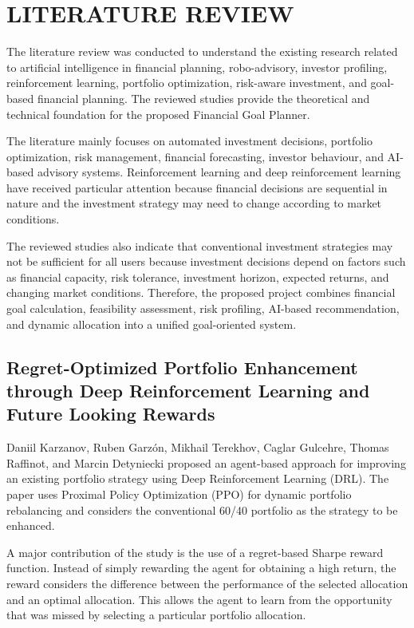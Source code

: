\chapter{\uppercase{Literature Review}}
The literature review was conducted to understand the existing research related to artificial intelligence in financial planning, robo-advisory, investor profiling, reinforcement learning, portfolio optimization, risk-aware investment, and goal-based financial planning. The reviewed studies provide the theoretical and technical foundation for the proposed Financial Goal Planner.

The literature mainly focuses on automated investment decisions, portfolio optimization, risk management, financial forecasting, investor behaviour, and AI-based advisory systems. Reinforcement learning and deep reinforcement learning have received particular attention because financial decisions are sequential in nature and the investment strategy may need to change according to market conditions.

The reviewed studies also indicate that conventional investment strategies may not be sufficient for all users because investment decisions depend on factors such as financial capacity, risk tolerance, investment horizon, expected returns, and changing market conditions. Therefore, the proposed project combines financial goal calculation, feasibility assessment, risk profiling, AI-based recommendation, and dynamic allocation into a unified goal-oriented system.

\section{Regret-Optimized Portfolio Enhancement through Deep Reinforcement Learning and Future Looking Rewards}
Daniil Karzanov, Ruben Garz\'on, Mikhail Terekhov, Caglar Gulcehre, Thomas Raffinot, and Marcin Detyniecki proposed an agent-based approach for improving an existing portfolio strategy using Deep Reinforcement Learning (DRL). The paper uses Proximal Policy Optimization (PPO) for dynamic portfolio rebalancing and considers the conventional 60/40 portfolio as the strategy to be enhanced.

A major contribution of the study is the use of a regret-based Sharpe reward function. Instead of simply rewarding the agent for obtaining a high return, the reward considers the difference between the performance of the selected allocation and an optimal allocation. This allows the agent to learn from the opportunity that was missed by selecting a particular portfolio allocation.

